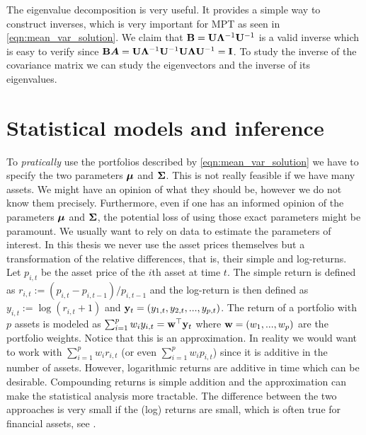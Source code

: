 \documentclass[oneside]{book}\usepackage{knitr}
\begin{document}
The eigenvalue decomposition is very useful.
It provides a simple way to construct inverses, which is very important for MPT as seen in \eqref{eqn:mean_var_solution}.
We claim that $\mathbf{B} = \mathbf{U} \boldsymbol{\Lambda}^{-1} \mathbf{U}^{-1}$ is a valid inverse which is easy to verify since $\mathbf{B} \mbox{\boldmath$A$} = \mathbf{U} \boldsymbol{\Lambda}^{-1} \mathbf{U}^{-1} \mathbf{U} \boldsymbol{\Lambda} \mathbf{U}^{-1} = \mathbf{I}$. 
To study the inverse of the covariance matrix we can study the eigenvectors and the inverse of its eigenvalues.

\chapter[Models \& inference]{Statistical models and inference}\label{ch:estim}


To \textit{pratically} use the portfolios described by \eqref{eqn:mean_var_solution} we have to specify the two parameters $\mbox{\boldmath$\mu$}$ and $\mathbf{\Sigma}$. 
This is not really feasible if we have many assets. 
We might have an opinion of what they should be, however we do not know them precisely.  
Furthermore, even if one has an informed opinion of the parameters $\mbox{\boldmath$\mu$}$ and $\mathbf{\Sigma}$, the potential loss of using those exact parameters might be paramount. 
We usually want to rely on data to estimate the parameters of interest. 
In this thesis we never use the asset prices themselves but a transformation of the relative differences, that is, their simple and log-returns. 
Let $p_{i,t}$ be the asset price of the $i$th asset at time $t$. 
The simple return is defined as $r_{i,t} := (p_{i,t}-p_{i,t-1})/p_{i,t-1}$ and the log-return is then defined as $y_{i,t} := \log(r_{i,t} + 1)$ and $\mathbf{y}_t=(y_{1,t},y_{2,t},..., y_{p,t})$.
The return of a portfolio with $p$ assets is modeled as $\sum_{i=1}^p w_i y_{i,t} = \mathbf{w}^\top \mathbf{y}_t$ where $\mathbf{w}=(w_1, ..., w_p)$ are the portfolio weights.
Notice that this is an approximation. 
In reality we would want to work with $\sum_{i=1}^p w_i r_{i,t}$ (or even $\sum_{i=1}^p w_i p_{i,t}$) since it is additive in the number of assets.
However, logarithmic returns are additive in time which can be desirable. 
Compounding returns is simple addition and the approximation can make the statistical analysis more tractable. 
The difference between the two approaches is very small if the (log) returns are small, which is often true for financial assets, see \citet[p. 5]{tsay2005analysis}. 
\end{document}
